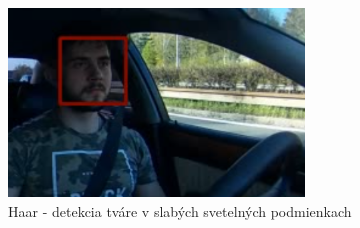 \documentclass[slovak,master,dept460,male,cpp,cpdeclaration]{diploma}
\begin{document}
\begin{figure}[H]
	\centering
	\includegraphics[width=0.7\textwidth]{Figures/haar2.png}
	\caption{Haar - detekcia tváre v slabých svetelných podmienkach}
	\label{fig:Haar2}
\end{figure}
\end{document}
